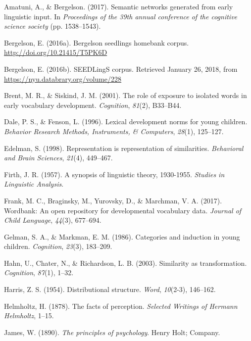 \documentclass[10pt, letterpaper]{article}
\begin{document}
\hypertarget{refs}{}
\hypertarget{ref-amatuni2017semantic}{}
Amatuni, A., \& Bergelson. (2017). Semantic networks generated from
early linguistic input. In \emph{Proceedings of the 39th annual
conference of the cognitive science society} (pp. 1538--1543).

\hypertarget{ref-bergelson2016seedlings}{}
Bergelson, E. (2016a). Bergelson seedlings homebank corpus.
\url{http://doi.org/10.21415/T5PK6D}

\hypertarget{ref-bergelson2016seedlingsdatabrary}{}
Bergelson, E. (2016b). SEEDLingS corpus. Retrieved January 26, 2018,
from \url{https://nyu.databrary.org/volume/228}

\hypertarget{ref-brent2001role}{}
Brent, M. R., \& Siskind, J. M. (2001). The role of exposure to isolated
words in early vocabulary development. \emph{Cognition}, \emph{81}(2),
B33--B44.

\hypertarget{ref-dale1996lexical}{}
Dale, P. S., \& Fenson, L. (1996). Lexical development norms for young
children. \emph{Behavior Research Methods, Instruments, \& Computers},
\emph{28}(1), 125--127.

\hypertarget{ref-edelman1998representation}{}
Edelman, S. (1998). Representation is representation of similarities.
\emph{Behavioral and Brain Sciences}, \emph{21}(4), 449--467.

\hypertarget{ref-firth1957synopsis}{}
Firth, J. R. (1957). A synopsis of linguistic theory, 1930-1955.
\emph{Studies in Linguistic Analysis}.

\hypertarget{ref-frank2017wordbank}{}
Frank, M. C., Braginsky, M., Yurovsky, D., \& Marchman, V. A. (2017).
Wordbank: An open repository for developmental vocabulary data.
\emph{Journal of Child Language}, \emph{44}(3), 677--694.

\hypertarget{ref-gelman1986categories}{}
Gelman, S. A., \& Markman, E. M. (1986). Categories and induction in
young children. \emph{Cognition}, \emph{23}(3), 183--209.

\hypertarget{ref-hahn2003similarity}{}
Hahn, U., Chater, N., \& Richardson, L. B. (2003). Similarity as
transformation. \emph{Cognition}, \emph{87}(1), 1--32.

\hypertarget{ref-harris1954distributional}{}
Harris, Z. S. (1954). Distributional structure. \emph{Word},
\emph{10}(2-3), 146--162.

\hypertarget{ref-helmholtz1878facts}{}
Helmholtz, H. (1878). The facts of perception. \emph{Selected Writings
of Hermann Helmholtz}, 1--15.

\hypertarget{ref-james2013principles}{}
James, W. (1890). \emph{The principles of psychology}. Henry Holt;
Company.
\end{document}
